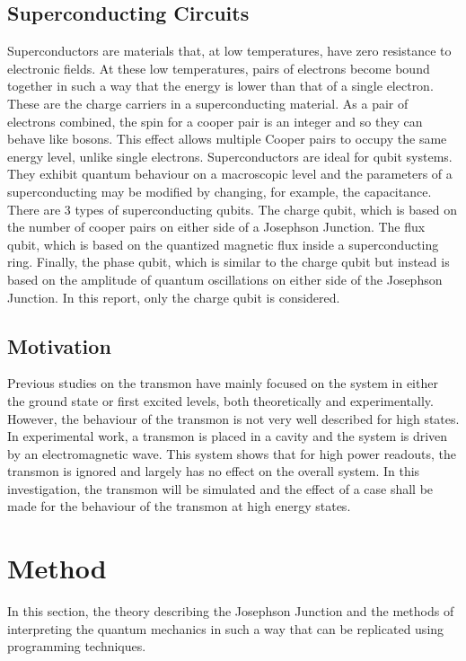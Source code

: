 \documentclass[11pt]{article}
\begin{document}
\subsection{Superconducting Circuits}
Superconductors are materials that, at low temperatures, have zero resistance to electronic fields. At these low temperatures, pairs of electrons become bound together in such a way that the energy is lower than that of a single electron. These are the charge carriers in a superconducting material. As a pair of electrons combined, the spin for a cooper pair is an integer and so they can behave like bosons. This effect allows multiple Cooper pairs to occupy the same energy level, unlike single electrons. Superconductors are ideal for qubit systems. They exhibit quantum behaviour on a macroscopic level and the parameters of a superconducting may be modified by changing, for example, the capacitance. There are 3 types of superconducting qubits. The charge qubit, which is based on the number of cooper pairs on either side of a Josephson Junction. The flux qubit, which is based on the quantized magnetic flux inside a superconducting ring. Finally, the phase qubit, which is similar to the charge qubit but instead is based on the amplitude of quantum oscillations on either side of the Josephson Junction. In this report, only the charge qubit is considered.

\subsection{Motivation}
Previous studies on the transmon have mainly focused on the system in either the ground state or first excited levels, both theoretically and experimentally. However, the behaviour of the transmon is not very well described for high states. In experimental work, a transmon is placed in a cavity and the system is driven by an electromagnetic wave. This system shows that for high power readouts, the transmon is ignored and largely has no effect on the overall system. In this investigation, the transmon will be simulated and the effect of a case shall be made for the behaviour of the transmon at high energy states.

\section{Method}
In this section, the theory describing the Josephson Junction and the methods of interpreting the quantum mechanics in such a way that can be replicated using programming techniques.
\end{document}
